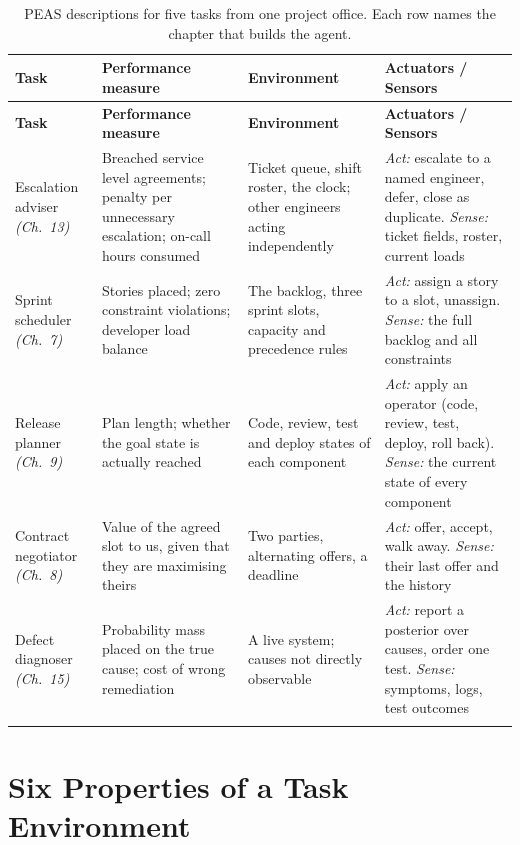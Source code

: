 \smallskip
\noindent\begin{longtable}{@{}L{2.9cm}L{3.5cm}L{3.5cm}L{4.1cm}@{}}
\toprule
\textbf{Task} & \textbf{Performance measure} & \textbf{Environment} &
\textbf{Actuators / Sensors} \\
\midrule
\endfirsthead
\toprule
\textbf{Task} & \textbf{Performance measure} & \textbf{Environment} &
\textbf{Actuators / Sensors} \\
\midrule
\endhead
Escalation adviser \newline \emph{(Ch.\ 13)} &
Breached service level agreements; penalty per unnecessary escalation; on-call
hours consumed &
Ticket queue, shift roster, the clock; other engineers acting independently &
\emph{Act:} escalate to a named engineer, defer, close as duplicate.
\emph{Sense:} ticket fields, roster, current loads \\
Sprint scheduler \newline \emph{(Ch.\ 7)} &
Stories placed; zero constraint violations; developer load balance &
The backlog, three sprint slots, capacity and precedence rules &
\emph{Act:} assign a story to a slot, unassign.
\emph{Sense:} the full backlog and all constraints \\
Release planner \newline \emph{(Ch.\ 9)} &
Plan length; whether the goal state is actually reached &
Code, review, test and deploy states of each component &
\emph{Act:} apply an operator (code, review, test, deploy, roll back).
\emph{Sense:} the current state of every component \\
Contract negotiator \newline \emph{(Ch.\ 8)} &
Value of the agreed slot to us, given that they are maximising theirs &
Two parties, alternating offers, a deadline &
\emph{Act:} offer, accept, walk away.
\emph{Sense:} their last offer and the history \\
Defect diagnoser \newline \emph{(Ch.\ 15)} &
Probability mass placed on the true cause; cost of wrong remediation &
A live system; causes not directly observable &
\emph{Act:} report a posterior over causes, order one test.
\emph{Sense:} symptoms, logs, test outcomes \\
\bottomrule
\caption{PEAS descriptions for five tasks from one project office. Each row names
the chapter that builds the agent.}\label{tab:peas}
\end{longtable}

\section{Six Properties of a Task Environment}

